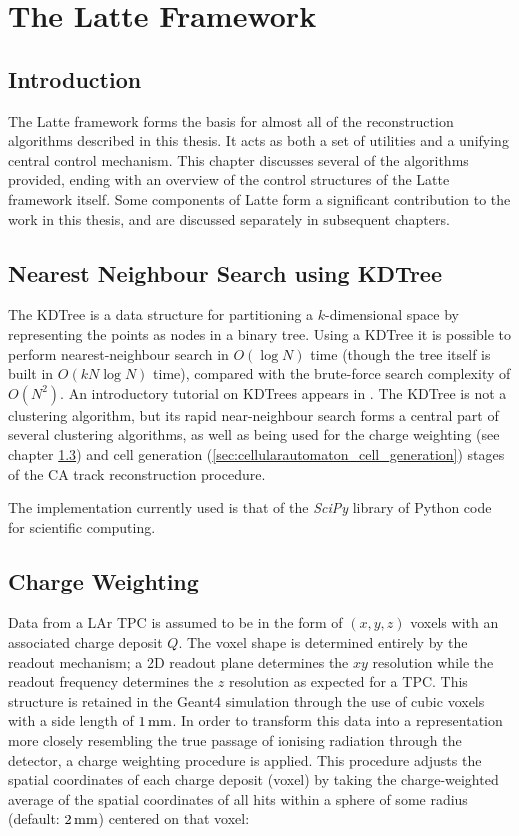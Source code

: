 \chapter{The Latte Framework}

\section{Introduction}
The Latte framework forms the basis for almost all of the reconstruction algorithms described in this thesis. It acts as both a set of utilities and a unifying central control mechanism. This chapter discusses several of the algorithms provided, ending with an overview of the control structures of the Latte framework itself. Some components of Latte form a significant contribution to the work in this thesis, and are discussed separately in subsequent chapters.

\section{Nearest Neighbour Search using \acs{KDTree}}\label{sec:latte_kdtree}
The \ac{KDTree} is a data structure for partitioning a $k$-dimensional space by representing the points as nodes in a binary tree. Using a \ac{KDTree} it is possible to perform nearest-neighbour search in $O(\log N)$ time\citep{Bentley1975} (though the tree itself is built in $O(kN\log N)$ time), compared with the brute-force search complexity of $O(N^2)$. An introductory tutorial on \aclp{KDTree} appears in \citep{Moore1991}. The \ac{KDTree} is not a clustering algorithm, but its rapid near-neighbour search forms a central part of several clustering algorithms, as well as being used for the charge weighting (see chapter \ref{sec:cellularautomaton_charge_weighting}) and cell generation (\ref{sec:cellularautomaton_cell_generation}) stages of the \acl{CA} track reconstruction procedure.

The implementation currently used is that of the \emph{SciPy}\citep{SciPy} library of Python code for scientific computing.

\section{Charge Weighting}\label{sec:cellularautomaton_charge_weighting}
Data from a \ac{LAr TPC} is assumed to be in the form of $(x, y, z)$ voxels with an associated charge deposit $Q$. The voxel shape is determined entirely by the readout mechanism; a 2D readout plane determines the $xy$ resolution while the readout frequency determines the $z$ resolution as expected for a \ac{TPC}. This structure is retained in the Geant4 simulation through the use of cubic voxels with a side length of $1\,\mathrm{mm}$. In order to transform this data into a representation more closely resembling the true passage of ionising radiation through the detector, a charge weighting procedure is applied. This procedure adjusts the spatial coordinates of each charge deposit (voxel) by taking the charge-weighted average of the spatial coordinates of all hits within a sphere of some radius (default: $2\,\mathrm{mm}$) centered on that voxel:

